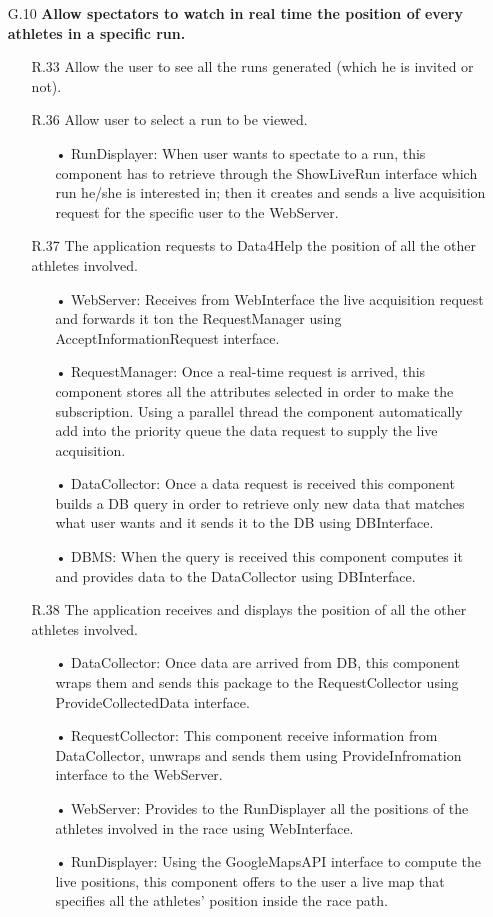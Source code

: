 \begin{enumerate}
\item [G.10] \textbf{Allow spectators to watch in real time the position of every athletes in a specific run.}
	\begin{enumerate}
	\item [R.33] Allow the user to see all the runs generated (which he is invited or not).
	\item [R.36] Allow user to select a run to be viewed.
		\begin{enumerate}
		\item[•] RunDisplayer: When user wants to spectate to a run, this component has to retrieve through the ShowLiveRun interface which run he/she is interested in; then it creates and sends a live acquisition request for the specific user to the WebServer.
		\end{enumerate}	
	\item [R.37] The application requests to Data4Help the position of all the other athletes involved.
		\begin{enumerate}
		\item[•] WebServer: Receives from WebInterface the live acquisition request and forwards it ton the RequestManager using AcceptInformationRequest interface.
		\item[•] RequestManager: Once a real-time request is arrived, this component stores all the attributes selected in order to make the subscription. Using a parallel thread the component automatically add into the priority queue the data request to supply the live acquisition.
		\item[•] DataCollector: Once a data request is received this component builds a DB query in order to retrieve only new data that matches what user wants and it sends it to the DB using DBInterface.
		\item[•] DBMS: When the query is received this component computes it and provides data to the DataCollector using DBInterface.
		\end{enumerate}	
	\item [R.38] The application receives and displays the position of all the other athletes involved.
		\begin{enumerate}
		\item[•] DataCollector: Once data are arrived from DB, this component wraps them and sends this package to the RequestCollector using ProvideCollectedData interface.
		\item[•] RequestCollector: This component receive information from DataCollector, unwraps and sends them using ProvideInfromation interface to the WebServer.
		\item[•] WebServer: Provides to the RunDisplayer all the positions of the athletes involved in the race using WebInterface.
		\item[•] RunDisplayer: Using the GoogleMapsAPI interface to compute the live positions, this component offers to the user a live map that specifies all the athletes' position inside the race path.
		\end{enumerate}	
	\end{enumerate}
	
\end{enumerate} 